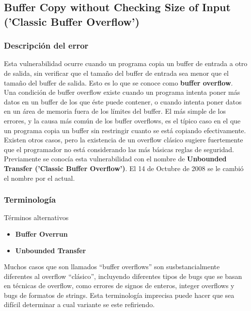 \subsection{Buffer Copy without Checking Size of Input ('Classic Buffer Overflow')}

\subsubsection{Descripción del error}

Esta vulnerabilidad ocurre cuando un programa copia un buffer de entrada a otro de salida, sin verificar que el tamaño del buffer de entrada sea menor que el tamaño del buffer de salida. 
Esto es lo que se conoce como \textbf{buffer overflow}.\\

Una condición de buffer overflow existe cuando un programa intenta poner más datos en un buffer de los que éste puede contener, o cuando intenta poner datos en un área de memoria
fuera de los límites del buffer. El más simple de los errores, y la causa más común de los buffer overflows, es el típico caso en el que un programa copia un buffer sin
restringir cuanto se está copiando efectivamente. Existen otros casos, pero la existencia de un overflow clásico sugiere fuertemente que el programador no está considerando
las más básicas reglas de seguridad. \\

Previamente se conocía esta vulnerabilidad con el nombre de \textbf{Unbounded Transfer ('Classic Buffer Overflow')}. El 14 de Octubre de 2008 se le cambió el nombre por el actual.

\subsubsection{Terminología}
Términos alternativos
\begin{itemize}
    \item \textbf{Buffer Overrun}
    \item \textbf{Unbounded Transfer}
\end{itemize}

Muchos casos que son llamados ``buffer overflows'' son susbstancialmente diferentes al overflow ``clásico'', incluyendo diferentes tipos de bugs que se basan en técnicas
de overflow, como errores de signos de enteros, integer overflows y bugs de formatos de strings. Esta terminología imprecisa puede hacer que sea difícil determinar a cual
variante se este refiriendo.

